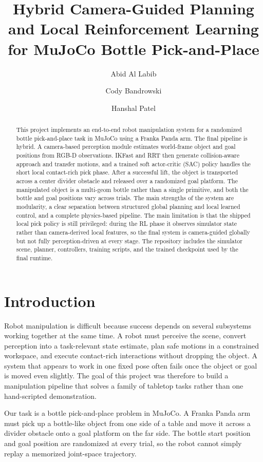 \documentclass[11pt]{article}
\title{Hybrid Camera-Guided Planning and Local Reinforcement Learning\\for MuJoCo Bottle Pick-and-Place}
\author{
  Abid Al Labib \and
  Cody Bandrowski \and
  Hanshal Patel
}
\date{}
\begin{document}
\maketitle

\begin{abstract}
This project implements an end-to-end robot manipulation system for a randomized bottle pick-and-place task in MuJoCo using a Franka Panda arm. The final pipeline is hybrid. A camera-based perception module estimates world-frame object and goal positions from RGB-D observations. IKFast and RRT then generate collision-aware approach and transfer motions, and a trained soft actor-critic (SAC) policy handles the short local contact-rich pick phase. After a successful lift, the object is transported across a center divider obstacle and released over a randomized goal platform. The manipulated object is a multi-geom bottle rather than a single primitive, and both the bottle and goal positions vary across trials. The main strengths of the system are modularity, a clear separation between structured global planning and local learned control, and a complete physics-based pipeline. The main limitation is that the shipped local pick policy is still privileged: during the RL phase it observes simulator state rather than camera-derived local features, so the final system is camera-guided globally but not fully perception-driven at every stage. The repository includes the simulator scene, planner, controllers, training scripts, and the trained checkpoint used by the final runtime.
\end{abstract}

\section{Introduction}

Robot manipulation is difficult because success depends on several subsystems working together at the same time. A robot must perceive the scene, convert perception into a task-relevant state estimate, plan safe motions in a constrained workspace, and execute contact-rich interactions without dropping the object. A system that appears to work in one fixed pose often fails once the object or goal is moved even slightly. The goal of this project was therefore to build a manipulation pipeline that solves a family of tabletop tasks rather than one hand-scripted demonstration.

Our task is a bottle pick-and-place problem in MuJoCo. A Franka Panda arm must pick up a bottle-like object from one side of a table and move it across a divider obstacle onto a goal platform on the far side. The bottle start position and goal position are randomized at every trial, so the robot cannot simply replay a memorized joint-space trajectory.
\end{document}
